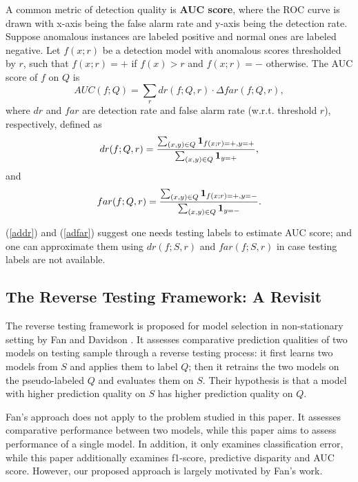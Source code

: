 A common metric of detection quality is {\bf AUC score}, 
where the ROC curve is drawn with x-axis being the false alarm 
rate and y-axis being the detection rate. 
Suppose anomalous instances are labeled positive and normal 
ones are labeled negative. Let $f(x;r)$ be a detection 
model with anomalous scores thresholded by $r$, 
such that $f(x; r) = +$ if $f(x) > r$ and $f(x; r) = -$ 
otherwise.  The AUC score of $f$ on $Q$ is 
\begin{equation}
AUC(f; Q) = \sum_{r} dr(f; Q, r) \cdot \Delta far(f; Q, r),  
\end{equation}
where $dr$ and $far$ are detection rate and false alarm rate 
(w.r.t. threshold $r$), respectively, defined as 
\begin{equation}
\label{addr}
dr(f; Q, r) = 
\frac{\sum_{(x,y) \in Q} {\bf 1}_{f(x; r) = +, y = +}}{
\sum_{(x,y) \in Q} {\bf 1}_{y = +}}, 
\end{equation}
and 
\begin{equation}
\label{adfar}
far(f; Q, r) = 
\frac{\sum_{(x,y) \in Q} {\bf 1}_{f(x; r) = +,  
y = -}}{\sum_{(x,y) \in Q} {\bf 1}_{y = -}}. 
\end{equation}

(\ref{addr}) and (\ref{adfar}) suggest one needs testing 
labels to estimate AUC score; and one can approximate them 
using $dr(f; S, r)$ and $far(f; S, r)$ in case testing labels 
are not available. 

\subsection{The Reverse Testing Framework: A Revisit}

The reverse testing framework is proposed for model 
selection in non-stationary setting by Fan and Davidson \cite{fan2006reverse}. 
It assesses comparative prediction qualities of two models 
on testing sample through a reverse testing process: 
it first learns two models from $S$ and applies them to 
label $Q$; then it retrains the two models on the 
pseudo-labeled $Q$ and evaluates them on $S$. Their hypothesis 
is that a model with higher prediction quality on $S$ has 
higher prediction quality on $Q$. 

Fan's approach does not apply to the problem studied 
in this paper. It assesses comparative performance 
between two models, while this paper aims to assess 
performance of a single model. 
In addition, it only examines classification error, 
while this paper additionally examines f1-score, 
predictive disparity and AUC score. 
However, our proposed approach is largely motivated 
by Fan's work. 


